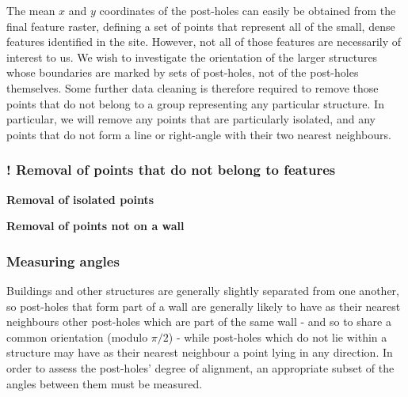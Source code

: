 \documentclass[../../ArchStats.tex]{subfiles}
\begin{document}
The mean $x$ and $y$ coordinates of the post-holes can easily be obtained from the final feature raster, defining a set of points that represent all of the small, dense features identified in the site. However, not all of those features are necessarily of interest to us. We wish to investigate the orientation of the larger structures whose boundaries are marked by sets of post-holes, not of the post-holes themselves. Some further data cleaning is therefore required to remove those points that do not belong to a group representing any particular structure. In particular, we will remove any points that are particularly isolated, and any points that do not form a line or right-angle with their two nearest neighbours.

\subsubsection{! Removal of points that do not belong to features}

\textbf{Removal of isolated points}





\textbf{Removal of points not on a wall}




\subsubsection{Measuring angles}

Buildings and other structures are generally slightly separated from one another, so post-holes that form part of a wall are generally likely to have as their nearest neighbours other post-holes which are part of the same wall - and so to share a common orientation (modulo $\pi/2$) - while post-holes which do not lie within a structure may have as their nearest neighbour a point lying in any direction. In order to assess the post-holes' degree of alignment, an appropriate subset of the angles between them must be measured.
\end{document}
